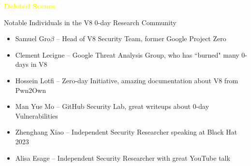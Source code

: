 \begin{frame}{}
    \centering
        \Huge\bfseries
    \textcolor{yellow}{Deleted Scenes}
\end{frame}

\begin{frame}{Notable Individuals in the V8 0-day Research Community}
    \begin{itemize}
        \item Samuel Gro$\beta$ -- Head of V8 Security Team, former Google Project Zero
        \item Clement Lecigne -- Google Threat Analysis Group, who has ``burned" many 0-days in V8 
        \item Hossein Lotfi -- Zero-day Initiative, amazing documentation about V8 from Pwn2Own 
        \item Man Yue Mo -- GitHub Security Lab, great writeups about 0-day Vulnerabilities 
        \item Zhenghang Xiao -- Independent Security Researcher speaking at Black Hat 2023
        \item Alisa Esage -- Independent Security Researcher with great YouTube talk
    \end{itemize}
    \break
    \href{https://phrack.org/issues/70/3.html}{\color{pink}{Samuel Grob's phrack.org article on V8 exploitation}}
    \break
    \href{https://www.youtube.com/watch?v=WouAptHlyC4}{\color{pink}{Alisa Esage's Modern Attacks on Google Chrome YouTube talk}}
\end{frame}

